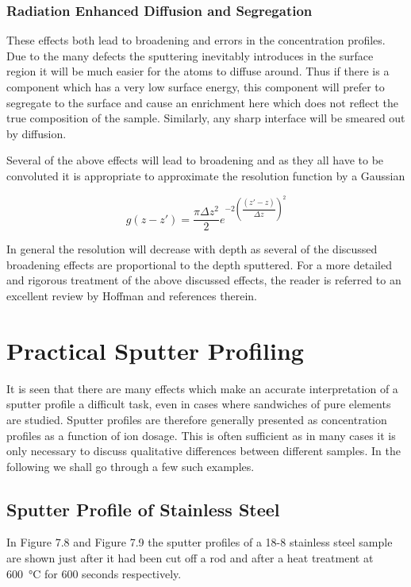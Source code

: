 \subsubsection{Radiation Enhanced Diffusion and Segregation}
These effects both lead to broadening and errors in the concentration profiles. Due to the many defects the sputtering inevitably introduces in the surface region it will be much easier for the atoms to diffuse around. Thus if there is a component which has a very low surface energy, this component will prefer to segregate to the surface and cause an enrichment here which does not reflect the true composition of the sample. Similarly, any sharp interface will be smeared out by diffusion.

Several of the above effects will lead to broadening and as they all have to be convoluted it is appropriate to approximate the resolution function by a Gaussian

\begin{equation}
g(z-z\prime)=\frac{\pi \Delta z^2}{2}e^{-2\left(\dfrac{(z\prime-z)}{\Delta z}\right)^2}
\end{equation}

In general the resolution will decrease with depth as several of the discussed broadening effects are proportional to the depth sputtered. For a more detailed and rigorous treatment of the above discussed effects, the reader is referred to an excellent review by Hoffman \cite{hoffman} and references therein.

\section{Practical Sputter Profiling}
It is seen that there are many effects which make an accurate interpretation of a sputter profile a difficult task, even in cases where sandwiches of pure elements are studied. Sputter profiles are therefore generally presented as concentration profiles as a function of ion dosage. This is often sufficient as in many cases it is only necessary to discuss qualitative differences between different samples. In the following we shall go through a few such examples.

\subsection{Sputter Profile of Stainless Steel}
In Figure 7.8 and Figure 7.9 the sputter profiles of a 18-8 stainless steel sample are shown just after it had been cut off a rod and after a heat treatment at \SI{600}{\degreeCelsius} for 600 seconds respectively.


